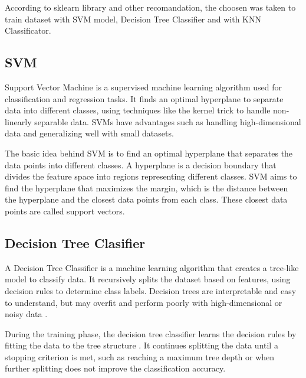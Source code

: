 According to sklearn library \cite{sklearn} and other\cite{towards_class} recomandation, the choosen was taken to train dataset with SVM model, Decision Tree Classifier and with KNN Classificator.

\subsection{SVM}

Support Vector Machine is a supervised machine learning algorithm used for classification and regression tasks. It finds an optimal hyperplane to separate data into different classes, using techniques like the kernel trick to handle non-linearly separable data\cite{tomaszkacmajor}. SVMs have advantages such as handling high-dimensional data and generalizing well with small datasets\cite{Zou}.

The basic idea behind SVM is to find an optimal hyperplane that separates the data points into different classes. A hyperplane is a decision boundary that divides the feature space into regions representing different classes. SVM aims to find the hyperplane that maximizes the margin, which is the distance between the hyperplane and the closest data points from each class. These closest data points are called support vectors\cite{PMC5822181}.

\subsection{Decision Tree Clasifier}

A Decision Tree Classifier is a machine learning algorithm that creates a tree-like model to classify data\cite{ibm_trees_decision_tree}. It recursively splits the dataset based on features, using decision rules to determine class labels. Decision trees are interpretable and easy to understand, but may overfit and perform poorly with high-dimensional or noisy data \cite{sklearn_tree}.

During the training phase, the decision tree classifier learns the decision rules by fitting the data to the tree structure \cite{Kotsiantis}. It continues splitting the data until a stopping criterion is met, such as reaching a maximum tree depth or when further splitting does not improve the classification accuracy. 

